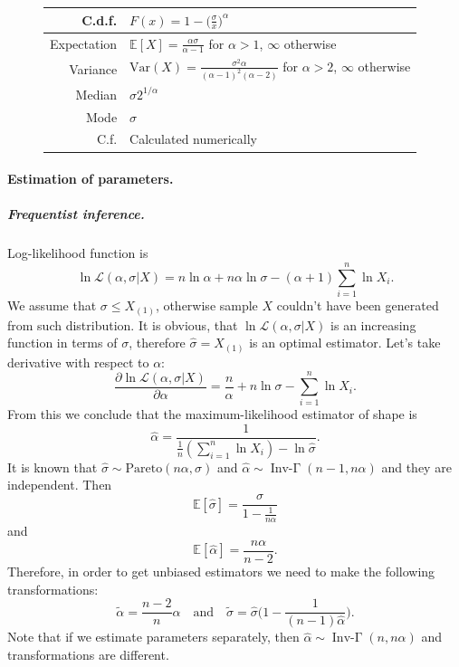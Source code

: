 \documentclass[a4paper,11pt]{article}
\theoremstyle{plain}
\theoremstyle{definition}
\newcommand{\ME}{\mathbb{E}}
\newcommand{\Var}{\mathrm{Var}}
\begin{document}
\begin{figure}[!htb]
\begin{minipage}{0.4\textwidth}
\begin{tabular}{| r | l |}
						\hline
						C.d.f. & $F(x)= 1-\big( \frac{\sigma}{x} \big)^\alpha $ \\
						\hline
						Expectation & \pbox{\linewidth}{$\ME[X] = \frac{\alpha\sigma}{\alpha-1}$ for $\alpha > 1$, \\ $\infty$ otherwise} \\
						\hline
						Variance & \pbox{\linewidth}{$\Var(X) = \frac{\sigma^2 \alpha}{(\alpha-1)^2(\alpha-2)}$ for $\alpha > 2$, \\ $\infty$ otherwise } \\
						\hline
						Median & $\sigma 2^{1/\alpha}$ \\
						\hline
						Mode & $\sigma$ \\
						\hline
						C.f. & Calculated numerically \\
						\hline
					\end{tabular}
				\end{minipage}
			\end{figure}
    
	\paragraph{Estimation of parameters.}
	\subparagraph{Frequentist inference.} Log-likelihood function is
	\[
	\ln \mathcal{L}(\alpha, \sigma | X) = n \ln \alpha + n \alpha \ln \sigma - (\alpha + 1) \sum_{i=1}^{n} \ln X_i.
	\]
	We assume that $\sigma \leq X_{(1)}$, otherwise sample $X$ couldn't have been generated from such distribution. It is obvious, that $\ln \mathcal{L}(\alpha, \sigma | X)$ is an increasing function in terms of $\sigma$, therefore $\hat{\sigma} = X_{(1)}$ is an optimal estimator.
	Let's take derivative with respect to $\alpha$:
	\[
	\frac{\partial \ln \mathcal{L}(\alpha, \sigma | X) }{\partial \alpha} = \frac{n}{\alpha} + n \ln \sigma - \sum_{i=1}^{n} \ln X_i.
	\]
	From this we conclude that the maximum-likelihood estimator of shape is
	\[
	\hat{\alpha} = \frac{1}{ \frac{1}{n} (\sum_{i=1}^{n} \ln X_i) - \ln \hat{\sigma} }.
	\]
	It is known that $\hat{\sigma} \sim \mathrm{Pareto}(n\alpha, \sigma)$ and $\hat{\alpha} \sim \operatorname{Inv-\Gamma}(n-1, n\alpha)$ and they are independent. Then
	\[ \ME[\hat{\sigma}] = \frac{ \sigma}{1-\frac{1}{n \alpha}}\]
	and
	\[ \ME[\hat{\alpha}] = \frac{n\alpha}{n-2}. \]
	Therefore, in order to get unbiased estimators we need to make the following transformations:
	\[ \tilde{\alpha} = \frac{n-2}{n}\hat{\alpha} \quad \text{and} \quad \tilde{\sigma} = \hat{\sigma} \bigg(1 - \frac{1}{(n-1)\hat{\alpha}}\bigg). \]
	Note that if we estimate parameters separately, then $\hat{\alpha} \sim \operatorname{Inv-\Gamma}(n, n\alpha)$ and transformations are different.
	
\end{document}
